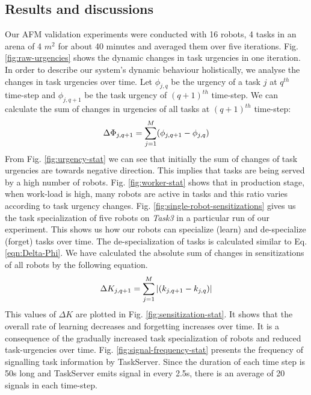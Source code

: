 \documentclass{intech}
\begin{document}
\subsection{Results and discussions}
Our AFM validation experiments were conducted with 16 robots, 4 tasks in an arena of 4 $m^2$ for about 40 minutes and averaged them over five iterations.
Fig. \ref{fig:raw-urgencies} shows the dynamic changes in task urgencies in one iteration.  In order to describe our system's dynamic behaviour holistically, we analyse the changes in task urgencies over time. Let $ \phi_{j, q}$ be the urgency of a task $j$ at $q^{th}$ time-step and $\phi_{j, q+1}$ be the task urgency of $(q+1)^{th}$ time-step. We can calculate the sum of changes in urgencies of all tasks at $(q+1)^{th}$ time-step:
\begin{equation} 
\small
\Delta \Phi_{j, q+1} = \sum_{j=1}^{M} (\phi_{j, q+1} - \phi_{j, q})
\label{eqn:Delta-Phi}
\end{equation}
From Fig. \ref{fig:urgency-stat} we can see that initially the sum of changes of task urgencies are towards negative direction. This implies that tasks are being served by a high number of robots. Fig. \ref{fig:worker-stat} shows that in production stage, when  work-load is high, many robots are active in tasks and this ratio varies according to task urgency changes.
Fig. \ref{fig:single-robot-sensitizations} gives us the task specialization of five robots on \textit{Task3} in a particular run of our experiment. This shows us how our robots can specialize (learn) and de-specialize (forget) tasks over time. The de-specialization of tasks is calculated similar to Eq. \ref{eqn:Delta-Phi}. We have calculated the absolute sum of changes in sensitizations of all robots by the following equation.
% 
\begin{equation}
\small 
\Delta K_{j, q+1} = \sum_{j=1}^{M}  |(k_{j, q+1} - k_{j,q})| 
\label{eqn:Delta-K}
\end{equation}
This values of $\Delta K$ are plotted in Fig. \ref{fig:sensitization-stat}. It shows that the overall rate of learning decreases and forgetting increases over time. It is a consequence of the gradually increased task specialization of robots and reduced task-urgencies over time.
Fig. \ref{fig:signal-frequency-stat} presents the frequency of signalling task information by TaskServer. Since the duration of each time step is 50s long and TaskServer emits signal in every 2.5s, there is an average of 20 signals in each time-step.
\end{document}
